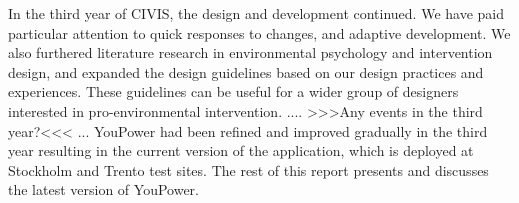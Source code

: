In the third year of CIVIS, the design and development continued. We have paid particular attention to quick responses to changes, and adaptive development. We also furthered literature research in environmental psychology and intervention design, and expanded the design guidelines based on our design practices and experiences. These guidelines can be useful for a wider group of designers interested in pro-environmental intervention.   .... >>>Any events in the third year?<<< ...   YouPower had been refined and improved gradually in the third year resulting in the current version of the application, which is deployed at Stockholm and Trento test sites. The rest of this report presents and discusses the latest version of YouPower. 

 
